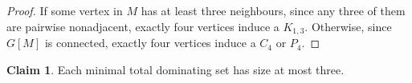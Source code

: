 \documentclass{amsart}
\theoremstyle{definition}
\newtheorem{claim}{Claim}
\begin{document}
\begin{proof}
If some vertex in $M$ has at least three neighbours, since any three of them are pairwise nonadjacent, exactly four vertices induce a $K_{1,3}$.
Otherwise, since $G[M]$ is connected, exactly four vertices induce a $C_{4}$ or $P_{4}$.
\end{proof}

\begin{claim}
Each minimal total dominating set has size at most three.
\end{claim}
\end{document}
